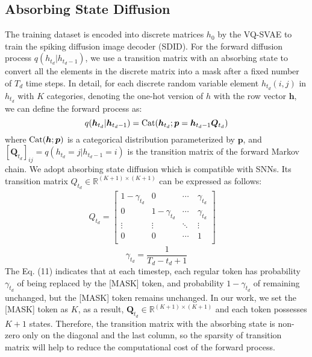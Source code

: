 \documentclass{article}
\begin{document}
\subsection{Absorbing State Diffusion}
The training dataset is encoded into discrete matrices $h_0$ by the VQ-SVAE to train the spiking diffusion image decoder (SDID). For the forward diffusion process $q(h_{t_d}|h_{t_d-1})$, we use a transition matrix with an absorbing state \cite{b30} to convert all the elements in the discrete matrix into a mask after a fixed number of $T_d$ time steps. In detail, for each discrete random variable element $h_{t_d}(i,j)$ in $h_{t_d}$ with $K$ categories, denoting the one-hot version of $h$ with the row vector $\bm{h}$, we can define the forward process as: 
\begin{equation}
q(\bm{h}_{t_d}|\bm{h}_{t_d-1})={\rm {Cat}}(\bm{h}_{t_d};\bm{p}=\bm{h}_{t_d-1}\bm{Q}_{t_d})
\end{equation}
where ${\rm{Cat}}(\bm{h};\bm{p})$ is a categorical distribution parameterized by $\bm{p}$, and $[\bm{Q}_{t_d}]_{ij}=q(h_{t_d}=j|h_{t_d-1}=i)$ is the transition matrix of the forward Markov chain. We adopt absorbing state diffusion which is compatible with SNNs. Its transition matrix ${Q}_{t_d}\in \mathbb R^{(K+1) \times (K+1)}$  can be expressed as follows:
\begin{equation}
\begin{aligned}
{Q}_{t_d}=
\begin{bmatrix}
1-	\gamma_{t_d} & 0  & \cdots   & \gamma_{t_d}   \\
0 & 1-\gamma_{t_d}  & \cdots   & 	\gamma_{t_d}  \\
\vdots & \vdots  & \ddots   & \vdots  \\
0 & 0  & \cdots\  & 1  \\
\end{bmatrix}
\end{aligned}
\quad
\end{equation}
\begin{equation}
    \gamma_{t_d}=\frac{1}{T_d-t_d+1}
\end{equation}
The Eq. (11) indicates that at each timestep, each regular token has probability $\gamma_{t_d}$ of being replaced by the [MASK] token, and probability $1-\gamma_{t_d}$ of remaining unchanged, but the [MASK] token remains unchanged. In our work, we set the [MASK] token as $K$, as a result, $\bm{Q}_{t_d} \in \mathbb R ^{(K+1)\times (K+1)}$ and each token possesses $K+1$ states.  Therefore, the transition matrix with the absorbing state is non-zero only on the diagonal and the last column, so the sparsity of transition matrix will help to reduce the computational cost of the forward process.
\end{document}
